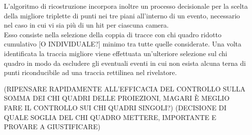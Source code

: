 \documentclass[8pt]{extarticle}
\begin{document}
L’algoritmo di ricostruzione incorpora inoltre un processo decisionale per la scelta della migliore triplette di punti nei tre piani all'interno di un evento, necessario nel caso in cui vi sia più di un hit per ciascuna camera. \\ 
Esso consiste nella selezione della coppia di tracce con chi quadro ridotto cumulativo [O INDIVIDUALE?] minimo tra tutte quelle considerate. Una volta identificata la traccia migliore viene effettuata un'ulteriore selezione sul chi quadro in modo da escludere gli eventuali eventi in cui non esista alcuna terna di punti riconducibile ad una traccia rettilinea nel rivelatore.

(RIPENSARE RAPIDAMENTE ALL'EFFICACIA DEL CONTROLLO SULLA SOMMA DEI CHI QUADRI DELLE PROIEZIONI, MAGARI È MEGLIO FARE IL CONTROLLO SUI CHI QUADRI SINGOLI?)
(DECISIONE DI QUALE SOGLIA DEL CHI QUADRO METTERE, IMPORTANTE E PROVARE A GIUSTIFICARE)\\
\end{document}
